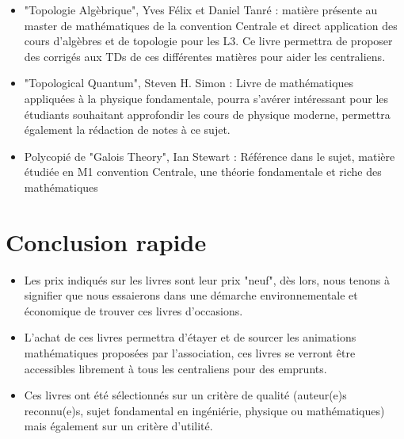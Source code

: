 \documentclass{beamer}
\begin{document}
\begin{frame}
  \begin{itemize}
    \item "Topologie Algèbrique", Yves Félix et Daniel Tanré : matière présente au master de mathématiques de la convention Centrale et direct application des cours d'algèbres et de topologie pour les L3. Ce livre permettra de proposer des corrigés aux TDs de ces différentes matières pour aider les centraliens.
    \item "Topological Quantum", Steven H. Simon : Livre de mathématiques appliquées à la physique fondamentale, pourra s'avérer intéressant pour les étudiants souhaitant approfondir les cours de physique moderne, permettra également la rédaction de notes à ce sujet. 
  \end{itemize}
\end{frame}

\begin{frame}
\begin{itemize}
  \item Polycopié de "Galois Theory", Ian Stewart : Référence dans le sujet, matière étudiée en M1 convention Centrale, une théorie fondamentale et riche des mathématiques
\end{itemize}
\end{frame}


\section{Conclusion rapide}
\begin{frame}
  \begin{itemize}
  \item  Les prix indiqués sur les livres sont leur prix "neuf", dès lors, nous tenons à signifier que nous essaierons dans une démarche environnementale et économique de trouver ces livres d'occasions. 
  \item   L'achat de ces livres permettra d'étayer et de sourcer les animations mathématiques proposées par l'association, ces livres se verront être accessibles librement à tous les centraliens pour des emprunts. 
  \item   Ces livres ont été sélectionnés sur un critère de qualité (auteur(e)s reconnu(e)s, sujet fondamental en ingéniérie, physique ou mathématiques) mais également sur un critère d'utilité.  

  \end{itemize}

\end{frame}
  
\end{document}
